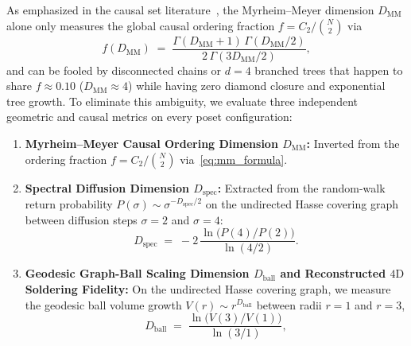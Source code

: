 \documentclass[11pt,a4paper]{article}
\theoremstyle{definition}
\theoremstyle{remark}
\begin{document}
As emphasized in the causal set literature~\cite{Myrheim1978,Surya2012}, the Myrheim--Meyer dimension $D_{\mathrm{MM}}$ alone only measures the global causal ordering fraction $f = C_2 / \binom{N}{2}$ via
\begin{equation}
\label{eq:mm_formula}
f(D_{\mathrm{MM}}) \;=\; \frac{\Gamma(D_{\mathrm{MM}} + 1)\,\Gamma(D_{\mathrm{MM}}/2)}{2\,\Gamma(3 D_{\mathrm{MM}}/2)},
\end{equation}
and can be fooled by disconnected chains or $d = 4$ branched trees that happen to share $f \approx 0.10$ ($D_{\mathrm{MM}} \approx 4$) while having zero diamond closure and exponential tree growth. To eliminate this ambiguity, we evaluate three independent geometric and causal metrics on every poset configuration:
\begin{enumerate}
    \item \textbf{Myrheim--Meyer Causal Ordering Dimension $D_{\mathrm{MM}}$:} Inverted from the ordering fraction $f = C_2 / \binom{N}{2}$ via~\eqref{eq:mm_formula}.
    \item \textbf{Spectral Diffusion Dimension $D_{\mathrm{spec}}$:} Extracted from the random-walk return probability $P(\sigma) \sim \sigma^{-D_{\mathrm{spec}}/2}$ on the undirected Hasse covering graph between diffusion steps $\sigma = 2$ and $\sigma = 4$:
    \begin{equation}
    D_{\mathrm{spec}} \;=\; -2\,\frac{\ln\bigl(P(4)/P(2)\bigr)}{\ln(4/2)}.
    \end{equation}
    \item \textbf{Geodesic Graph-Ball Scaling Dimension $D_{\mathrm{ball}}$ and Reconstructed $4\text{D}$ Soldering Fidelity:} On the undirected Hasse covering graph, we measure the geodesic ball volume growth $V(r) \sim r^{D_{\mathrm{ball}}}$ between radii $r = 1$ and $r = 3$,
    \begin{equation}
    D_{\mathrm{ball}} \;=\; \frac{\ln\bigl(V(3)/V(1)\bigr)}{\ln(3/1)},
    \end{equation}

\end{enumerate}
\end{document}
